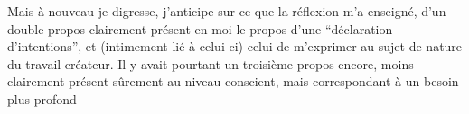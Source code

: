 Mais à nouveau je  digresse,  j'anticipe sur ce que la réflexion m'a enseigné,    d'un double propos clairement présent en moi   le propos d'une ``déclaration d'intentions'', et (intimement lié à celui-ci) celui de m'exprimer au sujet de  nature du travail créateur. Il y avait pourtant un troisième propos encore, moins clairement présent sûrement au niveau conscient, mais correspondant à un besoin plus profond

